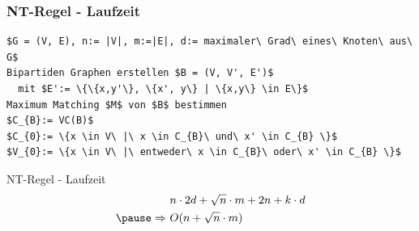 \documentclass{beamer}
\begin{document}
\begin{frame}[fragile]
\frametitle{NT-Regel - Laufzeit}
\begin{lstlisting}[mathescape = true, basicstyle=\ttfamily]
$G = (V, E), n:= |V|, m:=|E|, d:= maximaler\ Grad\ eines\ Knoten\ aus\ G$
Bipartiden Graphen erstellen $B = (V, V', E')$ 
  mit $E':= \{\{x,y'\}, \{x', y\} | \{x,y\} \in E\}$ 
Maximum Matching $M$ von $B$ bestimmen 
$C_{B}:= VC(B)$ 
$C_{0}:= \{x \in V\ |\ x \in C_{B}\ und\ x' \in C_{B} \}$ 
$V_{0}:= \{x \in V\ |\ entweder\ x \in C_{B}\ oder\ x' \in C_{B} \}$ 
\end{lstlisting}
\end{frame}
\begin{frame}{NT-Regel - Laufzeit}
\begin{align*}
&\ n \cdot 2d + \sqrt{n} \cdot m + 2n + k \cdot d\\ \pause
\Rightarrow &\ O(n + \sqrt{n} \cdot m)
\end{align*}
\end{frame}
\end{document}
